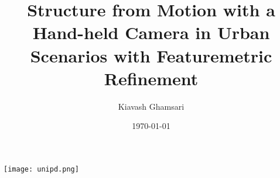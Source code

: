\title{Structure from Motion with a Hand-held Camera in Urban Scenarios with Featuremetric Refinement}
\author{Kiavash Ghamsari}
\date{\today}



    \maketitle
    {\texttt{[image: unipd.png]}}

    
    


